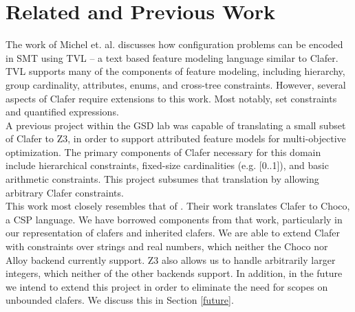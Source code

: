 \documentclass{easychair}
\begin{document}
\section{Related and Previous Work}
\indent The work of Michel et. al. \cite{Michel2012} discusses how configuration problems can be encoded in SMT using TVL \cite{Classen2011} -- a text based feature modeling language similar to Clafer. TVL supports many of the components of feature modeling, including hierarchy, group cardinality, attributes, enums, and cross-tree constraints. However, several aspects of Clafer require extensions to this work. Most notably, set constraints and quantified expressions. \\
\indent  A previous project \cite{Olaechea2013} within the GSD lab was capable of translating a small subset of Clafer to Z3, in order to support attributed feature models for multi-objective optimization. The primary components of Clafer necessary for this domain include hierarchical constraints, fixed-size cardinalities (e.g. [0..1]), and basic arithmetic constraints. This project subsumes that translation by allowing arbitrary Clafer constraints.\\
\indent This work most closely resembles that of \cite{Liang}. Their work translates Clafer to Choco, a CSP language. We have borrowed components from that work, particularly in our representation of clafers and inherited clafers. We are able to extend Clafer with constraints over strings and real numbers, which neither the Choco nor Alloy backend currently support. Z3 also allows us to handle arbitrarily larger integers, which neither of the other backends support. In addition, in the future we intend to extend this project in order to eliminate the need for scopes on unbounded clafers. We discuss this in Section \ref{future}. \\
\end{document}
